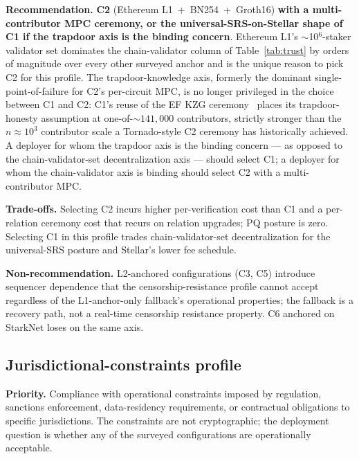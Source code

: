 \textbf{Recommendation.} \textbf{C2} (Ethereum L1~+~BN254~+~Groth16)
\textbf{with a multi-contributor MPC ceremony, or the
universal-SRS-on-Stellar shape of C1 if the trapdoor axis is the
binding concern}. Ethereum L1's $\sim$10$^6$-staker validator set
dominates the chain-validator column of Table~\ref{tab:trust} by
orders of magnitude over every other surveyed anchor and is the
unique reason to pick C2 for this profile. The trapdoor-knowledge
axis, formerly the dominant single-point-of-failure for C2's
per-circuit MPC, is no longer privileged in the choice between C1
and C2: C1's reuse of the EF KZG
ceremony~\cite{eth-kzg-ceremony} places its trapdoor-honesty
assumption at one-of-${\sim}141{,}000$ contributors, strictly
stronger than the $n \approx 10^3$ contributor scale a Tornado-style
C2 ceremony has historically achieved. A deployer for whom the
trapdoor axis is the binding concern --- as opposed to the
chain-validator-set decentralization axis --- should select C1; a
deployer for whom the chain-validator axis is binding should select
C2 with a multi-contributor MPC.

\textbf{Trade-offs.} Selecting C2 incurs higher per-verification
cost than C1 and a per-relation ceremony cost that recurs on
relation upgrades; PQ posture is zero. Selecting C1 in this profile
trades chain-validator-set decentralization for the universal-SRS
posture and Stellar's lower fee schedule.

\textbf{Non-recommendation.} L2-anchored configurations (C3, C5)
introduce sequencer dependence that the censorship-resistance
profile cannot accept regardless of the L1-anchor-only fallback's
operational properties; the fallback is a recovery path, not a
real-time censorship resistance property. C6 anchored on StarkNet
loses on the same axis.

\subsection{Jurisdictional-constraints profile}
\label{sec:rec-jurisdiction}

\textbf{Priority.} Compliance with operational constraints imposed
by regulation, sanctions enforcement, data-residency requirements,
or contractual obligations to specific jurisdictions. The
constraints are not cryptographic; the deployment question is
whether any of the surveyed configurations are operationally
acceptable.

